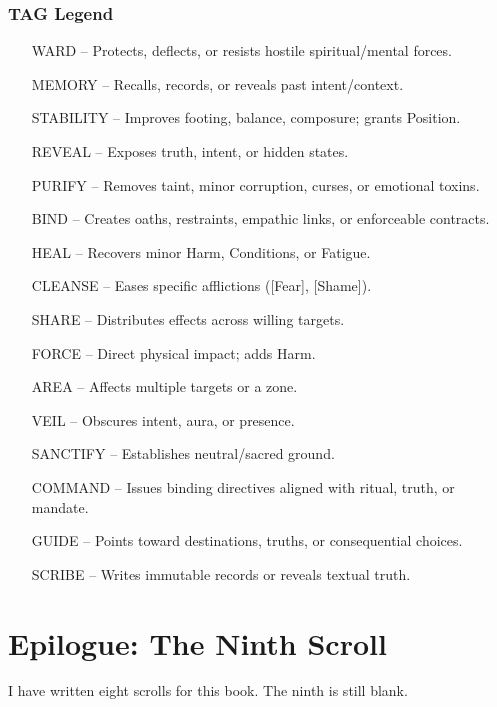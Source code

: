 \documentclass[12pt,oneside]{book}
\begin{document}
\subsection*{TAG Legend}
\begin{itemize}
  \item [WARD] -- Protects, deflects, or resists hostile spiritual/mental forces.
  \item [MEMORY] -- Recalls, records, or reveals past intent/context.
  \item [STABILITY] -- Improves footing, balance, composure; grants Position.
  \item [REVEAL] -- Exposes truth, intent, or hidden states.
  \item [PURIFY] -- Removes taint, minor corruption, curses, or emotional toxins.
  \item [BIND] -- Creates oaths, restraints, empathic links, or enforceable contracts.
  \item [HEAL] -- Recovers minor Harm, Conditions, or Fatigue.
  \item [CLEANSE] -- Eases specific afflictions ([Fear], [Shame]).
  \item [SHARE] -- Distributes effects across willing targets.
  \item [FORCE] -- Direct physical impact; adds Harm.
  \item [AREA] -- Affects multiple targets or a zone.
  \item [VEIL] -- Obscures intent, aura, or presence.
  \item [SANCTIFY] -- Establishes neutral/sacred ground.
  \item [COMMAND] -- Issues binding directives aligned with ritual, truth, or mandate.
  \item [GUIDE] -- Points toward destinations, truths, or consequential choices.
  \item [SCRIBE] -- Writes immutable records or reveals textual truth.
\end{itemize}

\chapter*{Epilogue: The Ninth Scroll}

I have written eight scrolls for this book. The ninth is still blank.
\end{document}
